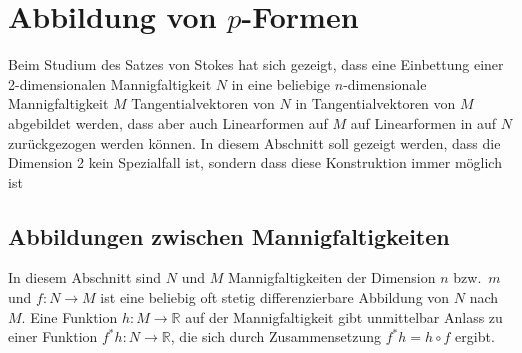 %
%
\section{Abbildung von $p$-Formen
\label{buch:pformen:section:abbildung}}
%
Beim Studium des Satzes von Stokes hat sich gezeigt, dass eine
Einbettung einer 2-dimensionalen Mannigfaltigkeit $N$ in eine beliebige
$n$-dimensionale Mannigfaltigkeit $M$ Tangentialvektoren von $N$ in
Tangentialvektoren von $M$ abgebildet werden, dass aber auch Linearformen
auf $M$ auf Linearformen in auf $N$ zurückgezogen werden können.
In diesem Abschnitt soll gezeigt werden, dass die Dimension 2
kein Spezialfall ist, sondern dass diese Konstruktion immer möglich ist

%
%
\subsection{Abbildungen zwischen Mannigfaltigkeiten}
In diesem Abschnitt sind $N$ und $M$ Mannigfaltigkeiten der Dimension
$n$ bzw.~$m$ und $f\colon N\to M$ ist eine beliebig oft stetig
differenzierbare Abbildung von $N$ nach $M$.
Eine Funktion $h\colon M\to\mathbb{R}$ auf der Mannigfaltigkeit gibt
unmittelbar Anlass zu einer Funktion $f^*h\colon N\to\mathbb{R}$,
die sich durch Zusammensetzung $f^*h=h\circ f$ ergibt.

%
%
